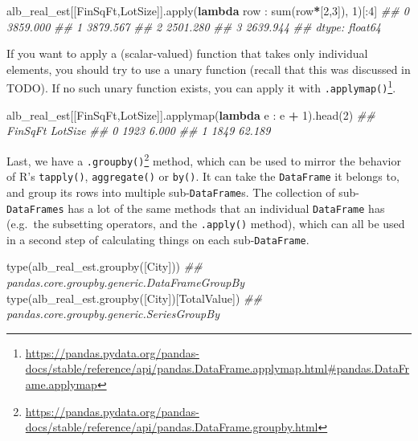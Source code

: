 \documentclass[
  12pt,
]{krantz}
\makeatletter
\newenvironment{Shaded}{\begin{snugshade}}{\end{snugshade}}
\newcommand{\BuiltInTok}[1]{#1}
\newcommand{\CommentTok}[1]{\textcolor[rgb]{0.37,0.37,0.37}{\textit{#1}}}
\newcommand{\DecValTok}[1]{\textcolor[rgb]{0.06,0.06,0.06}{#1}}
\newcommand{\KeywordTok}[1]{\textcolor[rgb]{0.27,0.27,0.27}{\textbf{#1}}}
\newcommand{\NormalTok}[1]{#1}
\newcommand{\OperatorTok}[1]{\textcolor[rgb]{0.43,0.43,0.43}{\textbf{#1}}}
\newcommand{\StringTok}[1]{\textcolor[rgb]{0.5,0.5,0.5}{#1}}
\renewcommand{\href}[2]{#2\footnote{\url{#1}}}
\newenvironment{kframe}{%
\medskip{}
\setlength{\fboxsep}{.8em}
 \def\at@end@of@kframe{}%
 \ifinner\ifhmode%
  \def\at@end@of@kframe{\end{minipage}}%
  \begin{minipage}{\columnwidth}%
 \fi\fi%
 \def\FrameCommand##1{\hskip\@totalleftmargin \hskip-\fboxsep
 \colorbox{shadecolor}{##1}\hskip-\fboxsep
     \hskip-\linewidth \hskip-\@totalleftmargin \hskip\columnwidth}%
 \MakeFramed {\advance\hsize-\width
   \@totalleftmargin\z@ \linewidth\hsize
   \@setminipage}}%
 {\par\unskip\endMakeFramed%
 \at@end@of@kframe}
\renewenvironment{Shaded}{\begin{kframe}}{\end{kframe}}
\makeatother
\begin{document}
\begin{Shaded}
\begin{Highlighting}[]
\NormalTok{alb\_real\_est[[}\StringTok{\textquotesingle{}FinSqFt\textquotesingle{}}\NormalTok{,}\StringTok{\textquotesingle{}LotSize\textquotesingle{}}\NormalTok{]].}\BuiltInTok{apply}\NormalTok{(}\KeywordTok{lambda}\NormalTok{ row : }\BuiltInTok{sum}\NormalTok{(row}\OperatorTok{*}\NormalTok{[}\DecValTok{2}\NormalTok{,}\DecValTok{3}\NormalTok{]), }\DecValTok{1}\NormalTok{)[:}\DecValTok{4}\NormalTok{]}
\CommentTok{\#\# 0    3859.000}
\CommentTok{\#\# 1    3879.567}
\CommentTok{\#\# 2    2501.280}
\CommentTok{\#\# 3    2639.944}
\CommentTok{\#\# dtype: float64}
\end{Highlighting}
\end{Shaded}

If you want to apply a (scalar-valued) function that takes only individual elements, you should try to use a unary function (recall that this was discussed in TODO). If no such unary function exists, you can apply it with \href{https://pandas.pydata.org/pandas-docs/stable/reference/api/pandas.DataFrame.applymap.html\#pandas.DataFrame.applymap}{\texttt{.applymap()}}.

\begin{Shaded}
\begin{Highlighting}[]
\NormalTok{alb\_real\_est[[}\StringTok{\textquotesingle{}FinSqFt\textquotesingle{}}\NormalTok{,}\StringTok{\textquotesingle{}LotSize\textquotesingle{}}\NormalTok{]].applymap(}\KeywordTok{lambda}\NormalTok{ e : e }\OperatorTok{+} \DecValTok{1}\NormalTok{).head(}\DecValTok{2}\NormalTok{)}
\CommentTok{\#\#    FinSqFt  LotSize}
\CommentTok{\#\# 0     1923    6.000}
\CommentTok{\#\# 1     1849   62.189}
\end{Highlighting}
\end{Shaded}

Last, we have a \href{https://pandas.pydata.org/pandas-docs/stable/reference/api/pandas.DataFrame.groupby.html}{\texttt{.groupby()}} method, which can be used to mirror the behavior of R's \texttt{tapply()}, \texttt{aggregate()} or \texttt{by()}. It can take the \texttt{DataFrame} it belongs to, and group its rows into multiple sub-\texttt{DataFrame}s. The collection of sub-\texttt{DataFrames} has a lot of the same methods that an individual \texttt{DataFrame} has (e.g.~the subsetting operators, and the \texttt{.apply()} method), which can all be used in a second step of calculating things on each sub-\texttt{DataFrame}.

\begin{Shaded}
\begin{Highlighting}[]
\BuiltInTok{type}\NormalTok{(alb\_real\_est.groupby([}\StringTok{\textquotesingle{}City\textquotesingle{}}\NormalTok{]))}
\CommentTok{\#\# pandas.core.groupby.generic.DataFrameGroupBy}
\BuiltInTok{type}\NormalTok{(alb\_real\_est.groupby([}\StringTok{\textquotesingle{}City\textquotesingle{}}\NormalTok{])[}\StringTok{\textquotesingle{}TotalValue\textquotesingle{}}\NormalTok{])}
\CommentTok{\#\# pandas.core.groupby.generic.SeriesGroupBy}
\end{Highlighting}
\end{Shaded}
\end{document}
